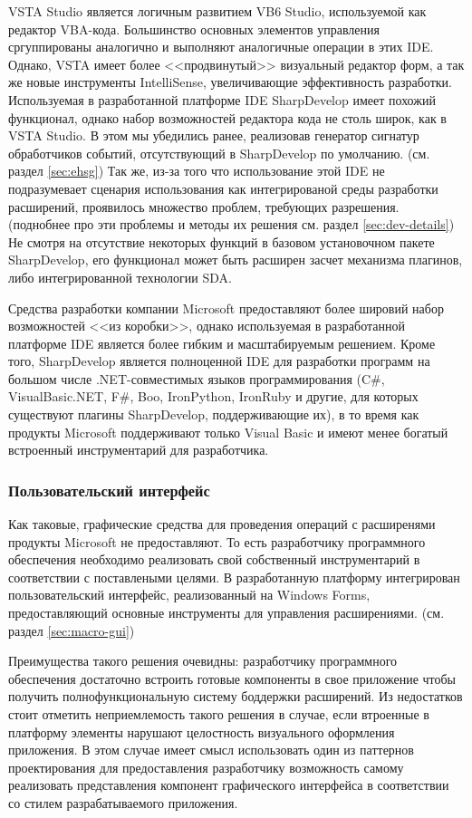 VSTA Studio является логичным развитием VB6 Studio, используемой как редактор VBA-кода. Большинство основных элементов управления сргуппированы аналогично и выполняют аналогичные операции в этих IDE. Однако, VSTA имеет более <<продвинутый>> визуальный редактор форм, а так же новые инструменты IntelliSense, увеличивающие эффективность разработки. Используемая в разработанной платформе IDE SharpDevelop имеет похожий функционал, однако набор возможностей редактора кода не столь широк, как в VSTA Studio. В этом мы убедились ранее, реализовав генератор сигнатур обработчиков событий, отсутствующий в SharpDevelop по умолчанию. (см. раздел \ref{sec:ehsg}) Так же, из-за того что использование этой IDE не подразумевает сценария использования как интегрированой среды разработки расширений, проявилось множество проблем, требующих разрешения. (поднобнее про эти проблемы и методы их решения см. раздел \ref{sec:dev-details}) Не смотря на отсутствие некоторых функций в базовом установочном пакете SharpDevelop, его функционал может быть расширен засчет механизма плагинов, либо интегрированной технологии SDA.

Средства разработки компании Microsoft предоставляют более шировий набор возможностей <<из коробки>>, однако используемая в разработанной платформе IDE является более гибким и масштабируемым решением. Кроме того, SharpDevelop является полноценной IDE для разработки программ на большом числе .NET-совместимых языков программирования (C\#, VisualBasic.NET, F\#, Boo, IronPython, IronRuby и другие, для которых существуют плагины SharpDevelop, поддерживающие их), в то время как продукты Microsoft поддерживают только Visual Basic и имеют менее богатый встроенный инструментарий для разработчика.

\subsubsection{Пользовательский интерфейс}

Как таковые, графические средства для проведения операций с расширенями продукты Microsoft не предоставляют. То есть разработчику программного обеспечения необходимо реализовать свой собственный инструментарий в соответствии с поставлеными целями. В разработанную платформу интегрирован пользовательский интерфейс, реализованный на Windows Forms, предоставляющий основные инструменты для управления расширениями. (см. раздел \ref{sec:macro-gui})

Преимущества такого решения очевидны: разработчику программного обеспечения достаточно встроить готовые компоненты в свое приложение чтобы получить полнофункциональную систему боддержки расширений. Из недостатков стоит отметить неприемлемость такого решения в случае, если втроенные в платформу элементы нарушают целостность визуального оформления приложения. В этом случае имеет смысл использовать один из паттернов проектирования для предоставления разработчику возможность самому реализовать представления компонент графического интерфейса в соответствии со стилем разрабатываемого приложения.

